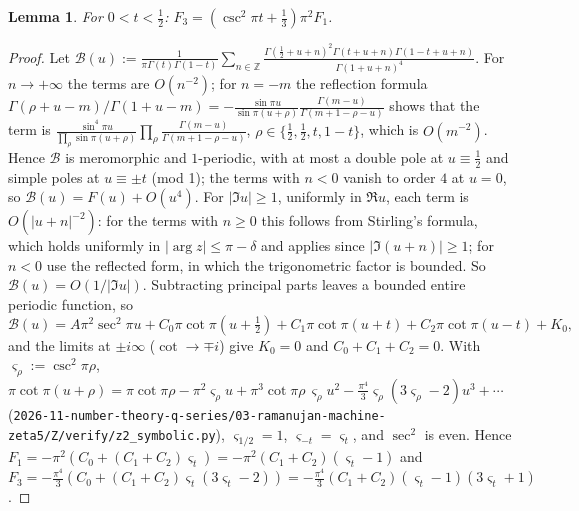 \documentclass[11pt]{amsart}
\newtheorem{lemma}[theorem]{Lemma}
\theoremstyle{definition}
\theoremstyle{remark}
\numberwithin{equation}{section}
\newcommand{\Z}{\mathbb{Z}}
\newcommand{\file}[1]{\nolinkurl{2026-11-number-theory-q-series/03-ramanujan-machine-zeta5/#1}}
\begin{document}
\begin{lemma}\label{lem:F3F1}
For $0<t<\frac12$: $F_3=(\csc^2\pi t+\frac13)\pi^2F_1$.
\end{lemma}
\begin{proof}
Let $\mathcal B(u):=\frac1{\pi\Gamma(t)\Gamma(1-t)}\sum_{n\in\Z}\frac{\Gamma(\frac12+u+n)^2\Gamma(t+u+n)\Gamma(1-t+u+n)}{\Gamma(1+u+n)^4}$. For $n\to+\infty$ the terms are $O(n^{-2})$; for $n=-m$ the reflection formula $\Gamma(\rho+u-m)/\Gamma(1+u-m)=-\frac{\sin\pi u}{\sin\pi(u+\rho)}\frac{\Gamma(m-u)}{\Gamma(m+1-\rho-u)}$ shows that the term is $\frac{\sin^4\pi u}{\prod_\rho\sin\pi(u+\rho)}\prod_\rho\frac{\Gamma(m-u)}{\Gamma(m+1-\rho-u)}$, $\rho\in\{\frac12,\frac12,t,1-t\}$, which is $O(m^{-2})$. Hence $\mathcal B$ is meromorphic and $1$-periodic, with at most a double pole at $u\equiv\frac12$ and simple poles at $u\equiv\pm t$ (mod 1); the terms with $n<0$ vanish to order $4$ at $u=0$, so $\mathcal B(u)=F(u)+O(u^4)$. For $|\Im u|\ge1$, uniformly in $\Re u$, each term is $O(|u+n|^{-2})$: for the terms with $n\ge0$ this follows from Stirling's formula, which holds uniformly in $|\arg z|\le\pi-\delta$ and applies since $|\Im(u+n)|\ge1$; for $n<0$ use the reflected form, in which the trigonometric factor is bounded. So $\mathcal B(u)=O(1/|\Im u|)$. Subtracting principal parts leaves a bounded entire periodic function, so
\[
\mathcal B(u)=A\pi^2\sec^2\pi u+C_0\pi\cot\pi(u+\tfrac12)+C_1\pi\cot\pi(u+t)+C_2\pi\cot\pi(u-t)+K_0,
\]
and the limits at $\pm i\infty$ ($\cot\to\mp i$) give $K_0=0$ and $C_0+C_1+C_2=0$. With $\varsigma_\rho:=\csc^2\pi\rho$, $\pi\cot\pi(u+\rho)=\pi\cot\pi\rho-\pi^2\varsigma_\rho u+\pi^3\cot\pi\rho\,\varsigma_\rho u^2-\frac{\pi^4}3\varsigma_\rho(3\varsigma_\rho-2)u^3+\cdots$ (\file{Z/verify/z2_symbolic.py}), $\varsigma_{1/2}=1$, $\varsigma_{-t}=\varsigma_t$, and $\sec^2$ is even. Hence $F_1=-\pi^2(C_0+(C_1+C_2)\varsigma_t)=-\pi^2(C_1+C_2)(\varsigma_t-1)$ and $F_3=-\frac{\pi^4}3(C_0+(C_1+C_2)\varsigma_t(3\varsigma_t-2))=-\frac{\pi^4}3(C_1+C_2)(\varsigma_t-1)(3\varsigma_t+1)$.
\end{proof}
\end{document}

